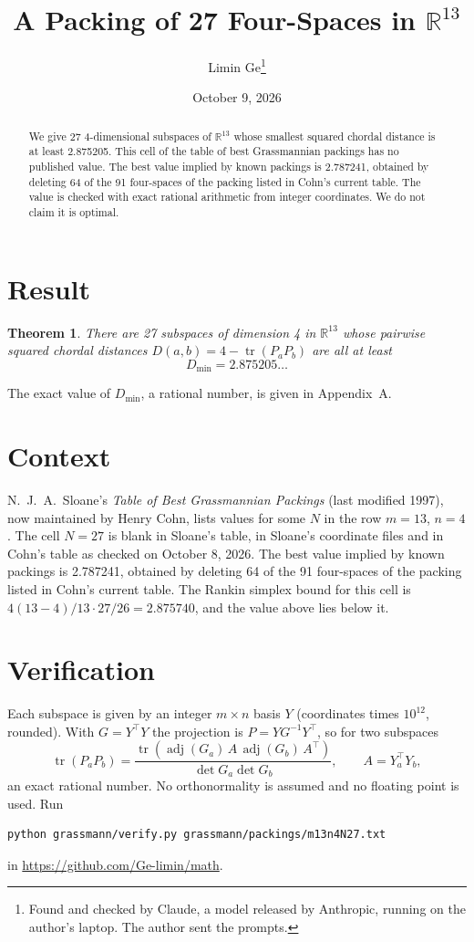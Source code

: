 \documentclass[11pt,a4paper]{article}
\title{A Packing of 27 Four-Spaces in $\mathbb{R}^{13}$}
\author{Limin Ge\thanks{Found and checked by Claude, a model released by Anthropic, running on the author's laptop. The author sent the prompts.}}
\date{October 9, 2026}
\newtheorem*{theorem}{Theorem}
\begin{document}
\maketitle
\begin{abstract}
We give 27 4-dimensional subspaces of $\mathbb{R}^{13}$ whose smallest squared chordal distance is at least 2.875205. This cell of the table of best Grassmannian packings has no published value. The best value implied by known packings is 2.787241, obtained by deleting 64 of the 91 four-spaces of the packing listed in Cohn's current table. The value is checked with exact rational arithmetic from integer coordinates. We do not claim it is optimal.
\end{abstract}

\section{Result}
\begin{theorem}
There are 27 subspaces of dimension 4 in $\mathbb{R}^{13}$ whose pairwise squared chordal distances $D(a,b) = 4 - \operatorname{tr}(P_aP_b)$ are all at least
\[ D_{\min} = 2.875205\ldots \]
\end{theorem}
The exact value of $D_{\min}$, a rational number, is given in Appendix~A.


\section{Context}
N.~J.~A.~Sloane's \emph{Table of Best Grassmannian Packings} (last modified 1997), now maintained by Henry Cohn, lists values for some $N$ in the row $m=13$, $n=4$. The cell $N=27$ is blank in Sloane's table, in Sloane's coordinate files and in Cohn's table as checked on October 8, 2026. The best value implied by known packings is 2.787241, obtained by deleting 64 of the 91 four-spaces of the packing listed in Cohn's current table. The Rankin simplex bound for this cell is $4(13-4)/13\cdot 27/26 = 2.875740$, and the value above lies below it.


\section{Verification}
Each subspace is given by an integer $m\times n$ basis $Y$ (coordinates times $10^{12}$, rounded). With $G=Y^\top Y$ the projection is $P=YG^{-1}Y^\top$, so for two subspaces
\[ \operatorname{tr}(P_aP_b)=\frac{\operatorname{tr}(\operatorname{adj}(G_a)\,A\,\operatorname{adj}(G_b)\,A^\top)}{\det G_a\det G_b},\qquad A=Y_a^\top Y_b, \]
an exact rational number. No orthonormality is assumed and no floating point is used. Run
\begin{verbatim}
python grassmann/verify.py grassmann/packings/m13n4N27.txt
\end{verbatim}
in \url{https://github.com/Ge-limin/math}.
\end{document}
